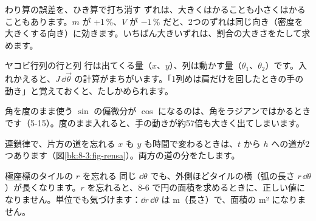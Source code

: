 \begin{tsumazuki}{わり算の誤差を、ひき算で打ち消す}
ずれは、大きくはかることも小さくはかることもあります。$m$ が +1\,\%、$V$ が $-1$\,\% だと、2つのずれは同じ向き（密度を大きくする向き）に効きます。いちばん大きいずれは、割合の大きさをたして求めます。
\end{tsumazuki}

\begin{tsumazuki}{ヤコビ行列の行と列}
行は出てくる量（$x$、$y$）、列は動かす量（$\theta_1$、$\theta_2$）です。入れかえると、$J\,\dd\vec\theta$ の計算がまちがいます。「1列めは肩だけを回したときの手の動き」と覚えておくと、たしかめられます。
\end{tsumazuki}

\begin{tsumazuki}{角を度のまま使う}
$\sin$ の偏微分が $\cos$ になるのは、角をラジアンではかるときです（5-15）。度のまま入れると、手の動きが約57倍も大きく出てしまいます。
\end{tsumazuki}

\begin{tsumazuki}{連鎖律で、片方の道を忘れる}
$x$ も $y$ も時間で変わるときは、$t$ から $h$ への道が2つあります（図\ref{bk:8-3:fig-rensa}）。両方の道の分をたします。
\end{tsumazuki}

\begin{tsumazuki}{極座標のタイルの $r$ を忘れる}
同じ $\dd\theta$ でも、外側ほどタイルの横（弧の長さ $r\,\dd\theta$）が長くなります。$r$ を忘れると、8-6 で円の面積を求めるときに、正しい値になりません。単位でも気づけます：$\dd r\,\dd\theta$ は m（長さ）で、面積の m² になりません。
\end{tsumazuki}

